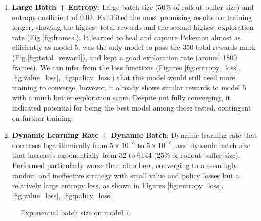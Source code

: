 \documentclass[10pt,conference]{IEEEtran}
\begin{document}
\begin{enumerate}
  \item \textbf{Large Batch + Entropy}: Large batch size (50\% of rollout buffer size) and entropy coefficient of 0.02.
  Exhibited the most promising results for training longer, showing the highest total rewards and the second highest exploration rate (Fig.\ref{fig:frames}). It learned to heal and capture Pokemon almost as efficiently as model 5, was the only model to pass the 350 total rewards mark (Fig.\ref{fig:total_reward}), and kept a good exploration rate (around 1800 frames). We can infer from the loss functions (Figures \ref{fig:entropy_loss}, \ref{fig:value_loss}, \ref{fig:policy_loss}) that this model would still need more training to converge, however, it already shows similar rewards to model 5 with a much better exploration score. Despite not fully converging, it indicated potential for being the best model among those tested, contingent on further training.

  \item \textbf{Dynamic Learning Rate + Dynamic Batch}: Dynamic learning rate that decreases logarithmically from \(5 \times 10^{-3}\) to \(5 \times 10^{-5}\), and dynamic batch size that increases exponentially from 32 to 6144 (25\% of rollout buffer size).
  Performed particularly worse than all others, converging to a seemingly random and ineffective strategy with small value and policy losses but a relatively large entropy loss, as shown in Figures \ref{fig:entropy_loss}, \ref{fig:value_loss}, \ref{fig:policy_loss}.

\end{enumerate}


\begin{figure}[h]
  \centering
  \caption{Exponential batch size on model 7.}
  \label{fig:exp}
\end{figure}
\end{document}
